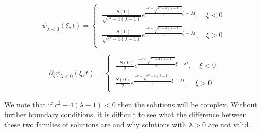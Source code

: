 \documentclass[12pt]{article}
\begin{document}
\begin{equation}\label{solnlambda-}
\psi_{\lambda <0}(\xi,t)=
\begin{cases}
\ \frac{-S(0)}{\sqrt{c^2-4(\lambda-1)}}e^{\frac{-c+\sqrt{c^2-4(\lambda-1)}}{2}\xi -\lambda t},\quad \xi < 0 \\
\ \frac{-S(0)}{\sqrt{c^2-4(\lambda-1)}}e^{\frac{-c-\sqrt{c^2-4(\lambda-1)}}{2}\xi-\lambda t},\quad \xi > 0\\
\end{cases}
\end{equation}

\begin{equation}\label{solndevlambda-}
\partial_{\xi}\psi_{\lambda <0}(\xi,t)=
\begin{cases}
\ \frac{-S(0)}{2}e^{\frac{-c+\sqrt{c^2-4(\lambda-1)}}{2}\xi -\lambda t},\quad \xi < 0 \\
\ \frac{S(0)}{2}e^{\frac{-c-\sqrt{c^2-4(\lambda-1)}}{2}\xi-\lambda t},\quad \xi > 0\\
\end{cases}
\end{equation}

We note that if $c^2-4(\lambda-1) < 0$  then the solutions will be complex. Without further boundary conditions, it is difficult to see what the difference between these two families of solutions are and why solutions with $\lambda > 0$ are not valid. 
\end{document}
